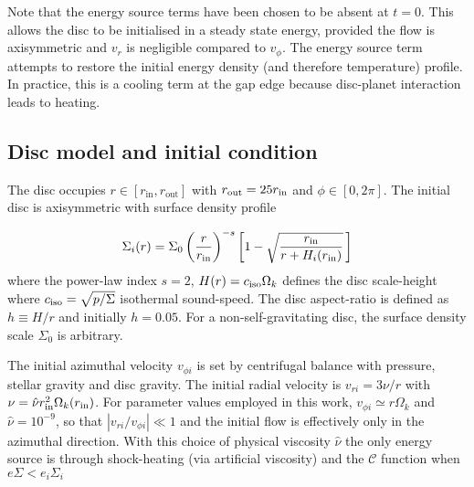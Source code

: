 Note that the energy source terms have been chosen to be absent 
at $t=0$. This allows the disc to be initialised in a steady state
energy, provided the flow is axisymmetric and $v_r$ is negligible compared to $v_\phi$.  
The energy source term attempts to restore the initial energy density (and
therefore temperature) profile. In practice, this is a cooling term at
the gap edge because disc-planet interaction leads to heating.  


\subsection{Disc model and initial condition}
The disc occupies $r\in[r_\mathrm{in}, r_\mathrm{out}]$ with $r_\mathrm{out} =
25r_\mathrm{in}$ and $\phi\in[0,2\pi]$. The initial disc is axisymmetric with
surface density profile  
 
\begin{align}\label{initial_density}
   \Sigma_i(r) = \Sigma_0\left(\frac{r}{r_\mathrm{in}}\right)^{-s}
    \left[1 - \sqrt{\frac{r_\mathrm{in}}{r + H_i(r_\mathrm{in})}}\,\right] 
\end{align}
where the power-law index $s=2$, $H(r) = c_\mathrm{iso}\Omega_k $ defines the disc scale-height 
where $c_\mathrm{iso}=\sqrt{p/\Sigma}$ isothermal sound-speed. The disc aspect-ratio is defined as $h\equiv H/r$ and initially
$h=0.05$. For a non-self-gravitating disc, the surface density scale
$\Sigma_0$ is arbitrary. 


The initial azimuthal velocity $v_{\phi i}$ is set by centrifugal balance with
pressure, stellar gravity and disc gravity. The initial radial velocity is $v_{r i}=3\nu/r$ 
with $\nu = \hat{\nu}r_\mathrm{in}^2\Omega_k(r_\mathrm{in})$. For parameter values employed in this work, $v_{\phi i}\simeq r\Omega_k$ 
and $\hat{\nu}= 10^{-9}$, so that $|v_{r i}/v_{\phi i}|\ll1$ and the initial 
flow is effectively only in the azimuthal direction.  With this choice of physical viscosity $\hat{\nu}$ the only energy source is through shock-heating (via artificial viscosity) and the $\mathcal{C}$ function when $e\Sigma<e_i\Sigma_i$


